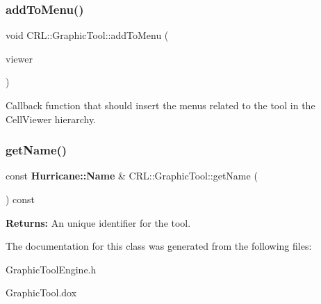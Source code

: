\subsubsection{\texorpdfstring{add\+To\+Menu()}{addToMenu()}}
{\footnotesize\ttfamily void C\+R\+L\+::\+Graphic\+Tool\+::add\+To\+Menu (\begin{DoxyParamCaption}\item[{\textbf{ Cell\+Viewer} $\ast$}]{viewer }\end{DoxyParamCaption})\hspace{0.3cm}{\ttfamily [pure virtual]}}

Callback function that should insert the menus related to the tool in the Cell\+Viewer hierarchy. \mbox{\label{classCRL_1_1GraphicTool_a4420ce085389f1f9111735031467848d}} 
\subsubsection{\texorpdfstring{get\+Name()}{getName()}}
{\footnotesize\ttfamily const \textbf{ Hurricane\+::\+Name} \& C\+R\+L\+::\+Graphic\+Tool\+::get\+Name (\begin{DoxyParamCaption}{ }\end{DoxyParamCaption}) const\hspace{0.3cm}{\ttfamily [pure virtual]}}

{\bfseries Returns\+:} An unique identifier for the tool. 

The documentation for this class was generated from the following files\+:\begin{DoxyCompactItemize}
\item 
Graphic\+Tool\+Engine.\+h\item 
Graphic\+Tool.\+dox\end{DoxyCompactItemize}
